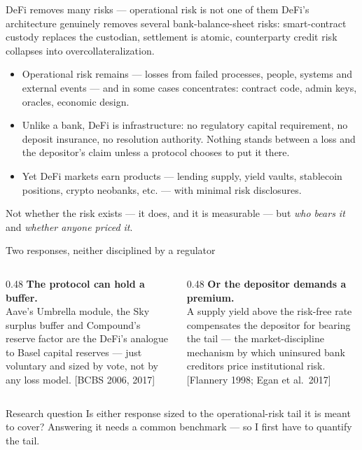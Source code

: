 \documentclass[10pt,xcolor=x11names,aspectratio=169]{beamer}
\newcommand{\src}[1]{[#1]}
\begin{document}
\begin{frame}{DeFi removes many risks --- operational risk is not one of them}
  DeFi's architecture genuinely removes several bank-balance-sheet risks:
  smart-contract custody replaces the custodian, settlement is atomic,
  counterparty credit risk collapses into overcollateralization.
  \begin{itemize}
    \item Operational risk remains --- losses from failed processes,
          people, systems and external events --- and in some cases
          concentrates: contract code, admin keys, oracles, economic design.
    \item Unlike a bank, DeFi is infrastructure: no regulatory capital
          requirement, no deposit insurance, no resolution authority. Nothing
          stands between a loss and the depositor's claim unless a protocol
          chooses to put it there.
    \item Yet DeFi markets earn products --- lending supply, yield vaults,
          stablecoin positions, crypto neobanks, etc. --- with minimal risk
          disclosures.
  \end{itemize}
  \begin{takeaway}
    Not whether the risk exists --- it does, and it is measurable --- but
    \emph{who bears it} and \emph{whether anyone priced it}.
  \end{takeaway}
\end{frame}

\begin{frame}{Two responses, neither disciplined by a regulator}
  \begin{columns}[T]
    \begin{column}{0.48\textwidth}
      \textbf{The protocol can hold a buffer.}\\[2pt]
      Aave's Umbrella
      module, the Sky surplus buffer and Compound's reserve factor are the
      DeFi's analogue to Basel capital reserves --- just voluntary and sized 
      by vote, not by any loss model. \src{BCBS 2006, 2017}
    \end{column}
    \begin{column}{0.48\textwidth}
      \textbf{Or the depositor demands a premium.}\\[2pt]
      A supply yield above the risk-free rate compensates the depositor for
      bearing the tail --- the market-discipline mechanism by which uninsured
      bank creditors price institutional risk.
      \src{Flannery 1998; Egan et al.\ 2017}
    \end{column}
  \end{columns}
  \vskip 6mm

  \begin{block}{Research question}
    Is either response sized to the operational-risk tail it is meant to
    cover? Answering it needs a common benchmark --- so I first have to
    quantify the tail.
  \end{block}
\end{frame}
\end{document}
